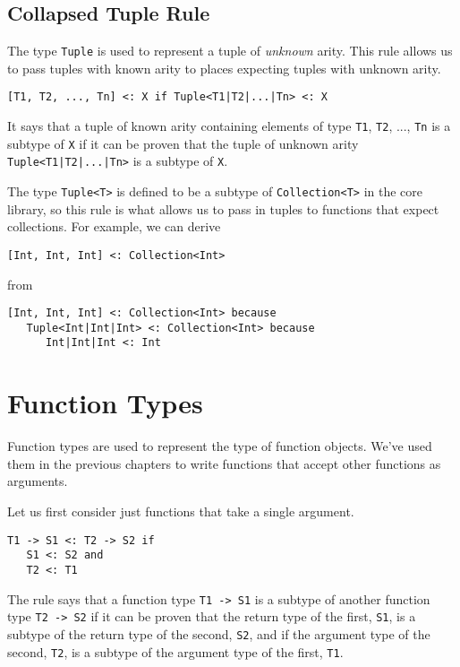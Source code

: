 \documentclass[10pt,oneside]{book}
\begin{document}
\subsection*{Collapsed Tuple Rule}
The type \texttt{\frenchspacing Tuple} is used to represent a tuple of {\em unknown} arity. This rule allows us to pass tuples with known arity to places expecting tuples with unknown arity.
\begin{lstlisting}
[T1, T2, ..., Tn] <: X if Tuple<T1|T2|...|Tn> <: X
\end{lstlisting}
It says that a tuple of known arity containing elements of type \texttt{\frenchspacing T1}, \texttt{\frenchspacing T2}, ..., \texttt{\frenchspacing Tn} is a subtype of \texttt{\frenchspacing X} if it can be proven that the tuple of unknown arity \texttt{\frenchspacing Tuple<T1|T2|...|Tn>} is a subtype of \texttt{\frenchspacing X}.

The type \texttt{\frenchspacing Tuple<T>} is defined to be a subtype of \texttt{\frenchspacing Collection<T>} in the core library, so this rule is what allows us to pass in tuples to functions that expect collections. For example, we can derive
\begin{lstlisting}
[Int, Int, Int] <: Collection<Int>
\end{lstlisting}
from
\begin{lstlisting}
[Int, Int, Int] <: Collection<Int> because
   Tuple<Int|Int|Int> <: Collection<Int> because
      Int|Int|Int <: Int
\end{lstlisting}

\section{Function Types}
Function types are used to represent the type of function objects. We've used them in the previous chapters to write functions that accept other functions as arguments.

Let us first consider just functions that take a single argument.
\begin{lstlisting}
T1 -> S1 <: T2 -> S2 if
   S1 <: S2 and
   T2 <: T1
\end{lstlisting}
The rule says that a function type \texttt{\frenchspacing T1 -> S1} is a subtype of another function type \texttt{\frenchspacing T2 -> S2} if it can be proven that the return type of the first, \texttt{\frenchspacing S1}, is a subtype of the return type of the second, \texttt{\frenchspacing S2}, and if the argument type of the second, \texttt{\frenchspacing T2}, is a subtype of the argument type of the first, \texttt{\frenchspacing T1}.
\end{document}
